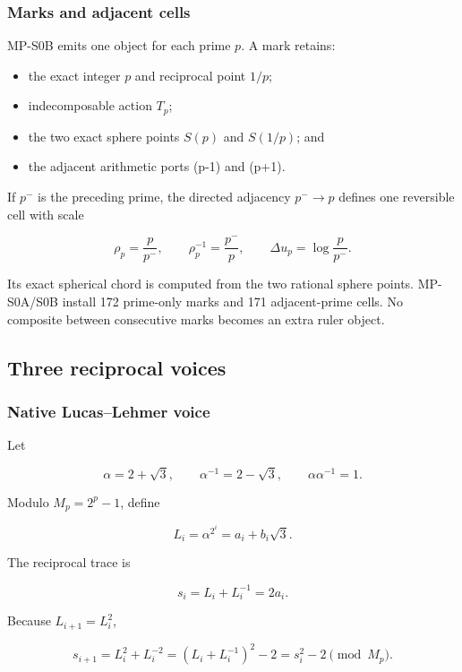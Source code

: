 \subsubsection{Marks and adjacent cells}\label{viii-ch10-marks-and-adjacent-cells}

MP-S0B emits one object for each prime \(p\). A mark retains:

\begin{itemize}
\tightlist
\item
  the exact integer \(p\) and reciprocal point \(1/p\);
\item
  indecomposable action \(T_p\);
\item
  the two exact sphere points \(S(p)\) and \(S(1/p)\); and
\item
  the adjacent arithmetic ports (p-1) and (p+1).
\end{itemize}

If \(p^-\) is the preceding prime, the directed adjacency \(p^-\to p\)
defines one reversible cell with scale

\[
\rho_p=\frac p{p^-},
\qquad
\rho_p^{-1}=\frac{p^-}{p},
\qquad
\Delta u_p=\log\frac p{p^-}.
\]

Its exact spherical chord is computed from the two rational sphere
points. MP-S0A/S0B install 172 prime-only marks and 171 adjacent-prime
cells. No composite between consecutive marks becomes an extra ruler
object.

\subsection{Three reciprocal voices}\label{viii-ch10-three-reciprocal-voices}

\subsubsection{Native Lucas--Lehmer
voice}\label{viii-ch10-native-lucaslehmer-voice}

Let

\[
\alpha=2+\sqrt3,
\qquad
\alpha^{-1}=2-\sqrt3,
\qquad
\alpha\alpha^{-1}=1.
\]

Modulo \(M_p=2^p-1\), define

\[
L_i=\alpha^{2^i}=a_i+b_i\sqrt3.
\]

The reciprocal trace is

\[
s_i=L_i+L_i^{-1}=2a_i.
\]

Because \(L_{i+1}=L_i^2\),

\[
s_{i+1}
=L_i^2+L_i^{-2}
=(L_i+L_i^{-1})^2-2
=s_i^2-2\pmod{M_p}.
\]

